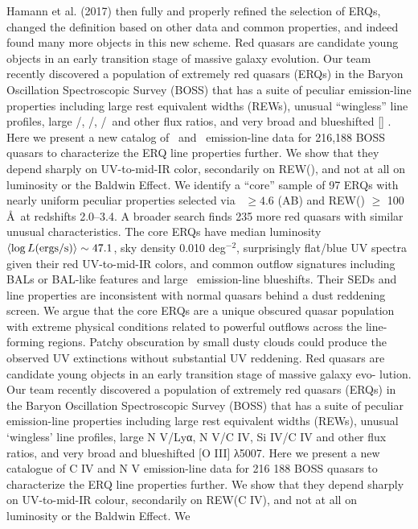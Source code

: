 Hamann et al. (2017) then fully and properly refined the selection of
ERQs, changed the definition based on other data and common
properties, and indeed found many more objects in this new scheme.
Red quasars are candidate young objects in an early transition stage of massive galaxy evolution. Our team recently discovered a population of extremely red quasars (ERQs) in the Baryon Oscillation Spectroscopic Survey (BOSS) that has a suite of peculiar emission-line properties including large rest equivalent widths (REWs), unusual ``wingless'' line profiles, large \nv /\lya , \nv /\civ , \siiv /\civ\ and other flux ratios, and very broad and blueshifted [\oiii ] . Here we present a new catalog of \civ\ and \nv\ emission-line data for 216,188 BOSS quasars to characterize the ERQ line properties further. We show that they depend sharply on UV-to-mid-IR color, secondarily on REW(\civ ), and not at all on luminosity or the Baldwin Effect. We identify a ``core'' sample of 97 ERQs with nearly uniform peculiar properties selected via \imw\ $\ge 4.6$ (AB) and REW(\civ ) $\ge$ 100 \AA\ at redshifts 2.0--3.4. A broader search finds 235 more red quasars with similar unusual characteristics. The core ERQs have median luminosity $\left<\log L ({\rm ergs/s})\right> \sim 47.1$, sky density 0.010 deg$^{-2}$, surprisingly flat/blue UV spectra given their red UV-to-mid-IR colors, and common outflow signatures including BALs or BAL-like features and large \civ\ emission-line blueshifts. Their SEDs and line properties are inconsistent with normal quasars behind a dust reddening screen. We argue that the core ERQs are a unique obscured quasar population with extreme physical conditions related to powerful outflows across the line-forming regions. Patchy obscuration by small dusty clouds could produce the observed UV extinctions without substantial UV reddening.
Red quasars are candidate young objects in an early transition stage
of massive galaxy evo- lution. Our team recently discovered a
population of extremely red quasars (ERQs) in the Baryon Oscillation
Spectroscopic Survey (BOSS) that has a suite of peculiar emission-line
properties including large rest equivalent widths (REWs), unusual
‘wingless’ line profiles, large N V/Lyα, N V/C IV, Si IV/C IV and
other flux ratios, and very broad and blueshifted [O III] λ5007. Here
we present a new catalogue of C IV and N V emission-line data for 216
188 BOSS quasars to characterize the ERQ line properties further. We
show that they depend sharply on UV-to-mid-IR colour, secondarily on
REW(C IV), and not at all on luminosity or the Baldwin Effect. We
